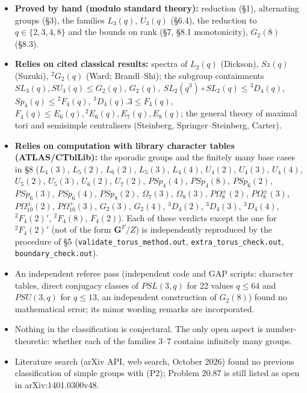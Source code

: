 \documentclass[11pt,a4paper]{article}
\providecommand{\tightlist}{\setlength{\itemsep}{1pt}\setlength{\parskip}{0pt}}
\begin{document}
\begin{itemize}
\tightlist
\item
  \textbf{Proved by hand (modulo standard theory):} reduction (§1),
  alternating groups (§3), the families \(L_3(q)\), \(U_3(q)\) (§6.4),
  the reduction to \(q\in\{2,3,4,8\}\) and the bounds on rank (§7, §8.1
  monotonicity), \(G_2(8)\) (§8.3).
\item
  \textbf{Relies on cited classical results:} spectra of \(L_2(q)\)
  (Dickson), \(Sz(q)\) (Suzuki), \({}^2G_2(q)\) (Ward; Brandl--Shi); the
  subgroup containments \(SL_3(q),SU_3(q)\le G_2(q)\),
  \(G_2(q),\ SL_2(q^3)\circ SL_2(q)\le{}^3D_4(q)\),
  \(Sp_4(q)\le{}^2F_4(q)\), \({}^3D_4(q).3\le F_4(q)\),
  \(F_4(q)\le E_6(q),{}^2E_6(q),E_7(q),E_8(q)\); the general theory of
  maximal tori and semisimple centralisers (Steinberg,
  Springer--Steinberg, Carter).
\item
  \textbf{Relies on computation with library character tables
  (ATLAS/CTblLib):} the sporadic groups and the finitely many base cases
  in §8 (\(L_4(3)\), \(L_5(2)\), \(L_6(2)\), \(L_5(3)\), \(L_4(4)\),
  \(U_4(2)\), \(U_4(3)\), \(U_4(4)\), \(U_5(2)\), \(U_5(3)\),
  \(U_6(2)\), \(U_7(2)\), \(PSp_4(4)\), \(PSp_4(8)\), \(PSp_6(2)\),
  \(PSp_6(3)\), \(PSp_6(4)\), \(PSp_8(2)\), \(\Omega_7(3)\),
  \(\Omega_9(3)\), \(P\Omega^\pm_8(2)\), \(P\Omega^\pm_8(3)\),
  \(P\Omega^\pm_{10}(2)\), \(P\Omega^+_{10}(3)\), \(G_2(3)\),
  \(G_2(4)\), \({}^3D_4(2)\), \({}^3D_4(3)\), \({}^3D_4(4)\),
  \({}^2F_4(2)'\), \({}^2F_4(8)\), \(F_4(2)\)). Each of these verdicts
  except the one for \({}^2F_4(2)'\) (not of the form \(\mathbf G^F/Z\))
  is independently reproduced by the procedure of §5
  (\texttt{validate\_torus\_method.out},
  \texttt{extra\_torus\_check.out}, \texttt{boundary\_check.out}).
\item
  An independent referee pass (independent code and GAP scripts:
  character tables, direct conjugacy classes of \(PSL(3,q)\) for 22
  values \(q\le64\) and \(PSU(3,q)\) for \(q\le13\), an independent
  construction of \(G_2(8)\)) found no mathematical error; its minor
  wording remarks are incorporated.
\item
  Nothing in the classification is conjectural. The only open aspect is
  number-theoretic: whether each of the families 3--7 contains
  infinitely many groups.
\item
  Literature search (arXiv API, web search, October 2026) found no
  previous classification of simple groups with (P2); Problem 20.87 is
  still listed as open in arXiv:1401.0300v48.
\end{itemize}
\end{document}
